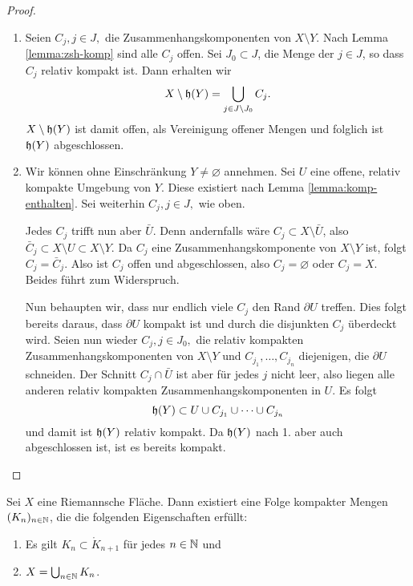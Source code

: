 \begin{proof}
  \begin{enumerate}
  \item Seien $C_j, j \in J,$ die Zusammenhangskomponenten von $X
    \setminus Y$. Nach Lemma \ref{lemma:zsh-komp} sind alle $C_j$ offen.
    Sei $J_0 \subset J$, die Menge der $j \in J$, so dass $C_j$
    relativ kompakt ist. Dann erhalten wir
    \[
    X \setminus \mathfrak{h}(Y) = \bigcup_{j \in J\setminus J_0} C_j.
    \]
    $X \setminus \mathfrak{h}(Y)$ ist damit offen, als Vereinigung offener Mengen und folglich
    ist $\mathfrak{h}(Y)$ abgeschlossen.
  \item Wir können ohne Einschränkung $Y \neq \varnothing$
    annehmen. Sei $U$ eine offene, relativ kompakte Umgebung von
    $Y$. Diese existiert nach Lemma \ref{lemma:komp-enthalten}.
    Sei weiterhin $C_j, j \in J,$ wie oben.

    Jedes $C_j$ trifft nun aber $\bar U$. Denn andernfalls wäre $C_j
    \subset X \setminus \bar U$, also $\bar C_j
    \subset X \setminus U \subset X \setminus Y$. Da $C_j$ eine
    Zusammenhangskomponente von $X \setminus Y$ ist, folgt $C_j =
    \bar C_j$. Also ist $C_j$ offen und abgeschlossen, also $C_j =
    \varnothing$ oder $C_j = X$. Beides führt zum Widerspruch.

    Nun behaupten wir, dass nur endlich viele $C_j$ den Rand $\partial
    U$ treffen. 
    Dies folgt bereits daraus, dass $\partial U$ kompakt ist und durch die
    disjunkten $C_j$ überdeckt wird.
    Seien nun wieder $C_j, j \in J_0,$ die relativ kompakten
    Zusammenhangskomponenten von $X \setminus Y$ und $C_{j_1}, \dots,
    C_{j_n}$ diejenigen, die $\partial U$ schneiden. Der Schnitt $C_j
    \cap \bar U$ ist aber für jedes $j$ nicht leer, also liegen alle
    anderen relativ kompakten Zusammenhangskomponenten in
    $U$. Es folgt
    \[
    \mathfrak{h}(Y) \subset U \cup C_{j_1} \cup \dots \cup C_{j_n}
    \]
    und damit ist $\mathfrak{h}(Y)$ relativ kompakt. Da $\mathfrak{h}(Y)$ nach 1. aber auch
    abgeschlossen ist, ist es bereits kompakt.
  \end{enumerate}
\end{proof}


\begin{thm}
  \label{thm:kompakte-ausschöpfung}
  Sei $X$ eine Riemannsche Fläche. Dann existiert eine Folge kompakter Mengen
  $(K_n)_{n \in \mathbb{N}}$, die die folgenden Eigenschaften erfüllt:
  \begin{enumerate}
  \item Es gilt $K_n \subset \mathring K_{n+1}$ für jedes $n \in \mathbb{N}$ und
  \item $X = \bigcup_{n \in \mathbb{N}} K_n$.
  \end{enumerate}
\end{thm}

